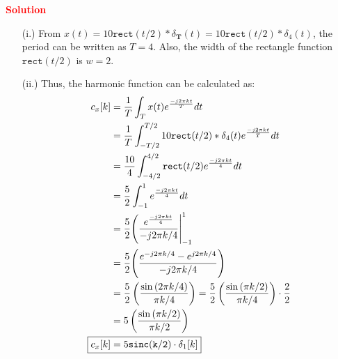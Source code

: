 \documentclass[a4paper, 12pt]{article}
\begin{document}
\begin{itemize}
\begin{itemize}
\textcolor{red}{\textbf{Solution}}
\begin{itemize}
\item[(i.)]{From $x(t) = 10\mathtt{rect}(t/2)*\delta_{\mathbf{T}}(t) = 10\mathtt{rect}(t/2)*\delta_{4}(t)$, the period can be written as $T = 4$. Also, the width of the rectangle function $\mathtt{rect}(t/2)$ is $w = 2$.}
\item[(ii.)]{Thus, the harmonic function can be calculated as:}
\begin{equation}
\begin{gathered}
\begin{alignedat}{1}
c_{x}[k] &= \frac{1}{T}\int_{T}{x(t)e^{\frac{-j2\pi k t}{T}}} dt\\
&= \frac{1}{T}\int_{-T/2}^{T/2}{10\mathtt{rect}(t/2)*\delta_{4}(t)e^{\frac{-j2\pi k t}{T}}} dt \\
&= \frac{10}{4}\int_{-4/2}^{4/2}{\mathtt{rect}(t/2)} e^{\frac{-j2\pi k t}{4}}dt \\
&= \frac{5}{2}\int_{-1}^{1}{e^{\frac{-j2\pi k t}{4}}} dt\\
&= \frac{5}{2}\Biggr( \frac{e^{\frac{-j2\pi k t}{4}}}{-j2 \pi k/4} \Biggr|^{1}_{-1} \\
&= \frac{5}{2} \Biggr( \frac{e^{-j2 \pi k / 4} - e^{j2 \pi k / 4}}{-j2 \pi k/4} \Biggr) \\
&= \frac{5}{2} \left( \frac{\sin\left(2 \pi k /4 \right)}{\pi k/ 4}\right) = \frac{5}{2} \left( \frac{\sin\left( \pi k /2 \right)}{\pi k/ 4}\right) \cdot \frac{2}{2} \\
&= 5 \left(\frac{\sin\left(\pi k /2 \right)}{\pi k/2} \right) \\
\Aboxed{c_{x}[k]&= 5 \mathtt{sinc(k/2)}\cdot \delta_{1}[k]}
\end{alignedat}
\end{gathered}
\end{equation}
\end{itemize}


\end{itemize}
\end{itemize}
\end{document}
